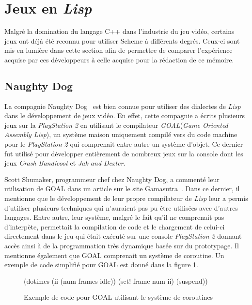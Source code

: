 \documentclass[12pt,oneside,letterpaper,francais]{book}
\newcommand{\lisp}{{\textit{Lisp }}}
\begin{document}
\section{Jeux en \lisp}

Malgré la domination du langage C++ dans l'industrie du jeu vidéo,
certains jeux ont déjà été reconnu pour utiliser Scheme à différents
degrés. Ceux-ci sont mis en lumière dans cette section afin de
permettre de comparer l'expérience acquise par ces développeurs à
celle acquise pour la rédaction de ce mémoire.


\subsection{Naughty Dog}


La compagnie Naughty Dog~\cite{ND} est bien connue pour utiliser des
dialectes de \lisp dans le développement de jeux vidéo. En effet, cette
compagnie a écrits plusieurs jeux sur la \textit{PlayStation 2} en
utilisant le compilateur \textit{GOAL}(\textit{Game Oriented Assembly
  Lisp}), un système maison uniquement compilé vers du code machine
pour le \textit{PlayStation 2} qui comprenait entre autre un système
d'objet. Ce dernier fut utilisé pour développer entièrement de
nombreux jeux sur la console dont les jeux \textit{Crash Bandicoot} et
\textit{Jak and Dexter}.

Scott Shumaker, programmeur chef chez Naughty Dog, a commenté leur
utilisation de GOAL dans un article sur le site
Gamasutra~\cite{ND_GOAL}. Dans ce dernier, il mentionne que le
développement de leur propre compilateur de \lisp leur a permis
d'utiliser plusieurs techniques qui n'auraient pas pu être utilisées
avec d'autres langages. Entre autre, leur système, malgré le fait
qu'il ne comprenait pas d'interpète, permettait la compilation de code
et le chargement de celui-ci directement dans le jeu qui était exécuté
sur une console \textit{PlayStation 2} donnant accès ainsi à de la
programmation très dynamique basée sur du prototypage. Il mentionne
également que GOAL comprenait un système de coroutine. Un exemple de
code simplifié pour GOAL est donné dans la figure \ref{Rev:goal}.

\begin{figure}[htb!]
  \begin{schemecode}
(dotimes (ii (num-frames idle))
  (set! frame-num ii)
  (suspend))
  \end{schemecode}
  \caption{Exemple de code pour GOAL utilisant le système de coroutines}
  \label{Rev:goal}
\end{figure}
\end{document}
